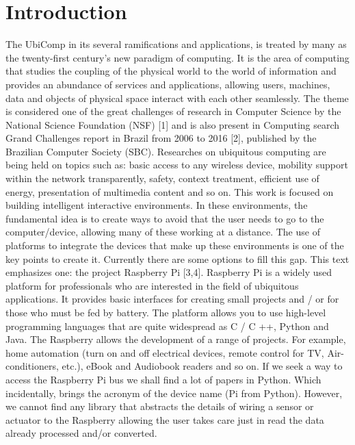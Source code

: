\documentclass{acm_proc_article-sp}
\begin{document}
\section{Introduction}
The UbiComp in its several ramifications and applications, is treated by many as the twenty-first century's new paradigm of computing. It is the area of computing that studies the coupling of the physical world to the world of information and provides an abundance of services and applications, allowing users, machines, data and objects of physical space interact with each other seamlessly. The theme is considered one of the great challenges of research in Computer Science by the National Science Foundation (NSF) [1] and is also present in Computing search Grand Challenges report in Brazil from 2006 to 2016 [2], published by the Brazilian Computer Society (SBC).
\newline
\newline
Researches on ubiquitous computing are being held on topics such as: basic access to any wireless device, mobility support within the network transparently, safety, context treatment, efficient use of energy, presentation of multimedia content and so on. This work is focused on building intelligent interactive environments. In these environments, the fundamental idea is to create ways to avoid that the user needs to go to the computer/device, allowing many of these working at a distance. The use of platforms to integrate the devices that make up these environments is one of the key points to create it. Currently there are some options to fill this gap. This text emphasizes one: the project Raspberry Pi [3,4].
\newline
\newline
Raspberry Pi is a widely used platform for professionals who are interested in the field of ubiquitous applications. It provides basic interfaces for creating small projects and / or for those who must be fed by battery. The platform allows you to use high-level programming languages that are quite widespread as C / C ++, Python and Java. The Raspberry allows the development of a range of projects. For example, home automation (turn on and off electrical devices, remote control for TV, Air-conditioners, etc.), eBook and Audiobook readers and so on.
\newline
\newline
If we seek a way to access the Raspberry Pi bus we shall find a lot of papers in Python. Which incidentally, brings the acronym of the device name (Pi from Python). However, we cannot find any library that abstracts the details of wiring a sensor or actuator to the Raspberry allowing the user takes care just in read the data already processed and/or converted.
\end{document}
